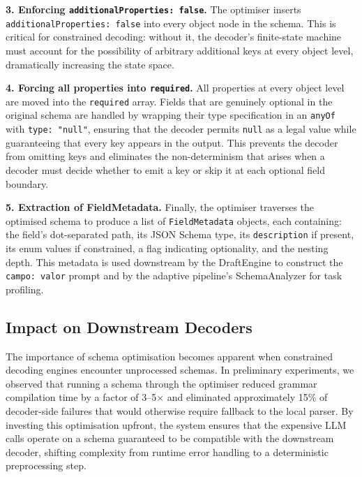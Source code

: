 \documentclass[onecolumn]{ceurart}
\begin{document}
\textbf{3. Enforcing \texttt{additionalProperties: false}.} The optimiser
inserts \texttt{additionalProperties: false} into every object node in the
schema. This is critical for constrained decoding: without it, the decoder's
finite-state machine must account for the possibility of arbitrary additional
keys at every object level, dramatically increasing the state space.

\textbf{4. Forcing all properties into \texttt{required}.} All properties at
every object level are moved into the \texttt{required} array. Fields that are
genuinely optional in the original schema are handled by wrapping their type
specification in an \texttt{anyOf} with \texttt{type: "null"}, ensuring that
the decoder permits \texttt{null} as a legal value while guaranteeing that
every key appears in the output. This prevents the decoder from omitting keys
and eliminates the non-determinism that arises when a decoder must decide
whether to emit a key or skip it at each optional field boundary.

\textbf{5. Extraction of FieldMetadata.} Finally, the optimiser traverses the
optimised schema to produce a list of \texttt{FieldMetadata} objects, each
containing: the field's dot-separated path, its JSON Schema type, its
\texttt{description} if present, its enum values if constrained, a flag
indicating optionality, and the nesting depth. This metadata is used downstream
by the DraftEngine to construct the \texttt{campo: valor} prompt and by the
adaptive pipeline's SchemaAnalyzer for task profiling.

\subsection{Impact on Downstream Decoders}

The importance of schema optimisation becomes apparent when constrained decoding
engines encounter unprocessed schemas. In preliminary experiments, we observed
that running a schema through the optimiser reduced grammar compilation time by
a factor of 3--5$\times$ and eliminated approximately 15\% of decoder-side
failures that would otherwise require fallback to the local parser. By investing
this optimisation upfront, the system ensures that the expensive LLM calls
operate on a schema guaranteed to be compatible with the downstream decoder,
shifting complexity from runtime error handling to a deterministic
preprocessing step.

\end{document}
